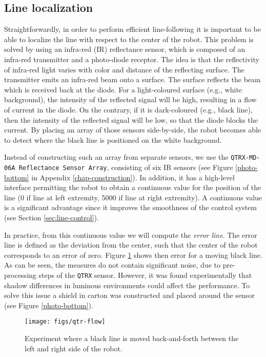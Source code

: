 \documentclass[12pt]{report}
\begin{document}
\subsection*{Line localization}
Straightforwardly, in order to perform efficient line-following it is important to be able to localize the line with respect to the center of the robot. This problem is solved by using an infra-red (IR) reflectance sensor, which is composed of an infra-red transmitter and a photo-diode receptor. The idea is that the reflectivity of infra-red light varies with color and distance of the reflecting surface.  The transmitter emits an infra-red beam onto a surface. The surface reflects the beam which is received back at the diode. For a light-coloured surface (e.g., white background), the intensity of the reflected signal will be high, resulting in a flow of current in the diode. On the contrary, if it is dark-coloured (e.g., black line), then the intensity of the reflected signal will be low, so that the diode blocks the current. By placing an array of those sensors side-by-side, the robot becomes able to detect where the black line is positioned on the white background. 

Instead of constructing such an array from separate sensors, we use the \texttt{QTRX-MD-06A Reflectance Sensor Array}, consisting of six IR sensors (see Figure \ref{photo-bottom} in Appendix \ref{chap-construction}). In addition, it has a high-level interface permitting the robot to obtain a continuous value for the position of the line (0 if line at left extremity, 5000 if line at right extremity). A continuous value is a significant advantage since it improves the smoothness of the control system (see Section \ref{sec:line-control}). 

In practice, from this continuous value we will compute the \textit{error line}. The error line is defined as the deviation from the center, such that the center of the robot corresponds to an error of zero. Figure \ref{fig:exp-qtr-flow} shows then error for a moving black line. As can be seen, the measures do not contain significant noise, due to pre-processing steps of the \texttt{QTRX} sensor. However, it was found experimentally that shadow differences in luminous environments could affect the performance. To solve this issue a shield in carton was constructed and placed around the sensor (see Figure \ref{photo-bottom}).
\begin{figure}[!h]
\centering
\texttt{[image: figs/qtr-flow]}
\caption{Experiment where a black line is moved back-and-forth between the left and right side of the robot.}
\label{fig:exp-qtr-flow}
\end{figure}
\end{document}
